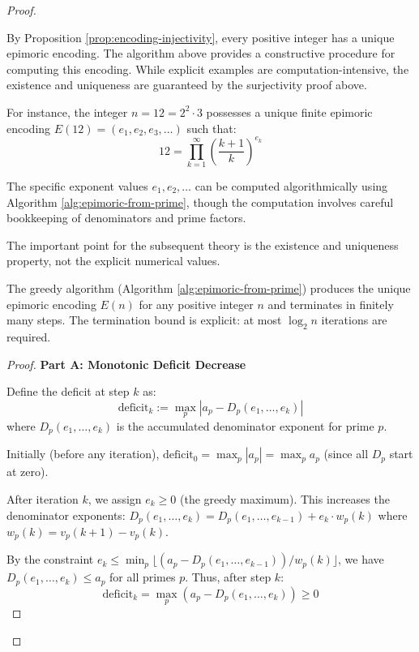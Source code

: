 \begin{proof}
\begin{remark}
By Proposition \ref{prop:encoding-injectivity}, every positive integer has a unique epimoric encoding. The algorithm above provides a constructive procedure for computing this encoding. While explicit examples are computation-intensive, the existence and uniqueness are guaranteed by the surjectivity proof above.

For instance, the integer $n = 12 = 2^2 \cdot 3$ possesses a unique finite epimoric encoding $E(12) = (e_1, e_2, e_3, \ldots)$ such that:
\[
12 = \prod_{k=1}^{\infty} \left(\frac{k+1}{k}\right)^{e_k}
\]

The specific exponent values $e_1, e_2, \ldots$ can be computed algorithmically using Algorithm \ref{alg:epimoric-from-prime}, though the computation involves careful bookkeeping of denominators and prime factors.

The important point for the subsequent theory is the existence and uniqueness property, not the explicit numerical values.

\end{remark}

\begin{theorem}
\label{thm:epimoric-algorithm-correctness}

The greedy algorithm (Algorithm \ref{alg:epimoric-from-prime}) produces the unique epimoric encoding $E(n)$ for any positive integer $n$ and terminates in finitely many steps. The termination bound is explicit: at most $\log_2 n$ iterations are required.

\begin{proof}

\noindent \textbf{Part A: Monotonic Deficit Decrease}

Define the deficit at step $k$ as:
\begin{equation}
\text{deficit}_k := \max_p |a_p - D_p(e_1, \ldots, e_k)|
\end{equation}
where $D_p(e_1, \ldots, e_k)$ is the accumulated denominator exponent for prime $p$.

Initially (before any iteration), $\text{deficit}_0 = \max_p |a_p| = \max_p a_p$ (since all $D_p$ start at zero).

After iteration $k$, we assign $e_k \geq 0$ (the greedy maximum). This increases the denominator exponents: $D_p(e_1, \ldots, e_k) = D_p(e_1, \ldots, e_{k-1}) + e_k \cdot w_p(k)$ where $w_p(k) = v_p(k+1) - v_p(k)$.

By the constraint $e_k \leq \min_p \lfloor (a_p - D_p(e_1, \ldots, e_{k-1})) / w_p(k) \rfloor$, we have $D_p(e_1, \ldots, e_k) \leq a_p$ for all primes $p$. Thus, after step $k$:
\begin{equation}
\text{deficit}_k = \max_p (a_p - D_p(e_1, \ldots, e_k)) \geq 0
\end{equation}


\end{proof}
\end{theorem}
\end{proof}
